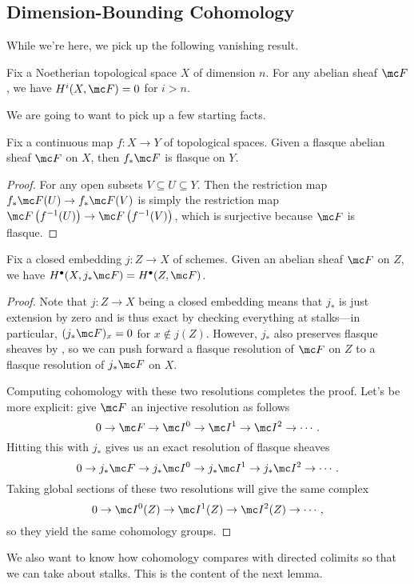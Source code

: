 \documentclass[../notes.tex]{subfiles}
\begin{document}
\subsection{Dimension-Bounding Cohomology}
While we're here, we pick up the following vanishing result.
\begin{theorem} \label{thm:dimension-bound-cohom}
	Fix a Noetherian topological space $X$ of dimension $n$. For any abelian sheaf $\mc F$, we have $H^i(X,\mc F)=0$ for $i>n$.
\end{theorem}
We are going to want to pick up a few starting facts.
\begin{lemma} \label{lem:pull-preserves-flasque}
	Fix a continuous map $f\colon X\to Y$ of topological spaces. Given a flasque abelian sheaf $\mc F$ on $X$, then $f_*\mc F$ is flasque on $Y$.
\end{lemma}
\begin{proof}
	For any open subsets $V\subseteq U\subseteq Y$. Then the restriction map $f_*\mc F(U)\to f_*\mc F(V)$ is simply the restriction map $\mc F\left(f^{-1}(U)\right)\to\mc F\left(f^{-1}(V)\right)$, which is surjective because $\mc F$ is flasque.
\end{proof}
\begin{corollary}
	Fix a closed embedding $j\colon Z\to X$ of schemes. Given an abelian sheaf $\mc F$ on $Z$, we have $H^\bullet(X,j_*\mc F)=H^\bullet(Z,\mc F)$.
\end{corollary}
\begin{proof}
	Note that $j\colon Z\to X$ being a closed embedding means that $j_*$ is just extension by zero and is thus exact by checking everything at stalks---in particular, $(j_*\mc F)_x=0$ for $x\notin j(Z)$. However, $j_*$ also preserves flasque sheaves by , so we can push forward a flasque resolution of $\mc F$ on $Z$ to a flasque resolution of $j_*\mc F$ on $X$.
	
	Computing cohomology with these two resolutions completes the proof. Let's be more explicit: give $\mc F$ an injective resolution as follows
	\[0\to\mc F\to\mc I^0\to\mc I^1\to\mc I^2\to\cdots.\]
	Hitting this with $j_*$ gives us an exact resolution of flasque sheaves
	\[0\to j_*\mc F\to j_*\mc I^0\to j_*\mc I^1\to j_*\mc I^2\to\cdots.\]
	Taking global sections of these two resolutions will give the same complex
	\[0\to\mc I^0(Z)\to\mc I^1(Z)\to\mc I^2(Z)\to\cdots,\]
	so they yield the same cohomology groups.
\end{proof}
We also want to know how cohomology compares with directed colimits so that we can take about stalks. This is the content of the next lemma.
\end{document}
